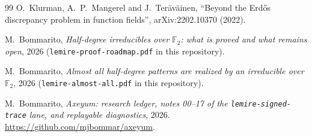 \documentclass[10pt]{article}
\theoremstyle{plain}
\theoremstyle{definition}
\newcommand{\F}{\mathbb F}
\begin{document}
\begin{thebibliography}{99}
O.~Klurman, A.~P.~Mangerel and J.~Ter\"av\"ainen, ``Beyond the Erd\H{o}s
discrepancy problem in function fields'', arXiv:2202.10370 (2022).

M.~Bommarito, \emph{Half-degree irreducibles over $\F_2$: what is proved and
what remains open}, 2026 (\texttt{lemire-proof-roadmap.pdf} in this
repository).

M.~Bommarito, \emph{Almost all half-degree patterns are realized by an
irreducible over $\F_2$}, 2026 (\texttt{lemire-almost-all.pdf} in this
repository).

M.~Bommarito, \emph{Axeyum: research ledger, notes 00--17 of the
\texttt{lemire-signed-trace} lane, and replayable diagnostics}, 2026.
\url{https://github.com/mjbommar/axeyum}.

\end{thebibliography}
\end{document}
